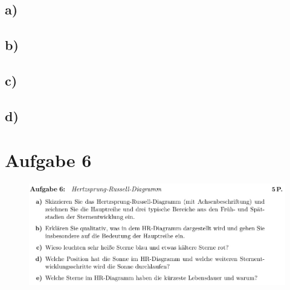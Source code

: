 \subsection{a)}

\subsection{b)}

\subsection{c)}

\subsection{d)}


\section{Aufgabe 6}

\begin{figure}[H]
    \centering
    \includegraphics[width=\textwidth]{images/Aufgabe6.jpg}
    \label{fig:3}
\end{figure}

